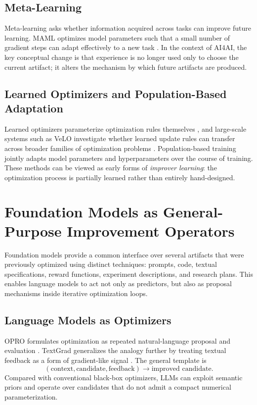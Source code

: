 \documentclass[journal]{IEEEtran}
\begin{document}
\subsection{Meta-Learning}
Meta-learning asks whether information acquired across tasks can improve future learning. MAML optimizes model parameters such that a small number of gradient steps can adapt effectively to a new task \cite{finn2017maml}. In the context of AI4AI, the key conceptual change is that experience is no longer used only to choose the current artifact; it alters the mechanism by which future artifacts are produced.

\subsection{Learned Optimizers and Population-Based Adaptation}
Learned optimizers parameterize optimization rules themselves \cite{andrychowicz2016learning}, and large-scale systems such as VeLO investigate whether learned update rules can transfer across broader families of optimization problems \cite{metz2022velo}. Population-based training jointly adapts model parameters and hyperparameters over the course of training. These methods can be viewed as early forms of \emph{improver learning}: the optimization process is partially learned rather than entirely hand-designed.

\section{Foundation Models as General-Purpose Improvement Operators}
\label{sec:llm}

Foundation models provide a common interface over several artifacts that were previously optimized using distinct techniques: prompts, code, textual specifications, reward functions, experiment descriptions, and research plans. This enables language models to act not only as predictors, but also as proposal mechanisms inside iterative optimization loops.

\subsection{Language Models as Optimizers}
OPRO formulates optimization as repeated natural-language proposal and evaluation \cite{yang2023opro}. TextGrad generalizes the analogy further by treating textual feedback as a form of gradient-like signal \cite{yuksekgonul2024textgrad}. The general template is
\begin{equation*}
(\text{context},\text{candidate},\text{feedback})\rightarrow\text{improved candidate}.
\end{equation*}
Compared with conventional black-box optimizers, LLMs can exploit semantic priors and operate over candidates that do not admit a compact numerical parameterization.
\end{document}
